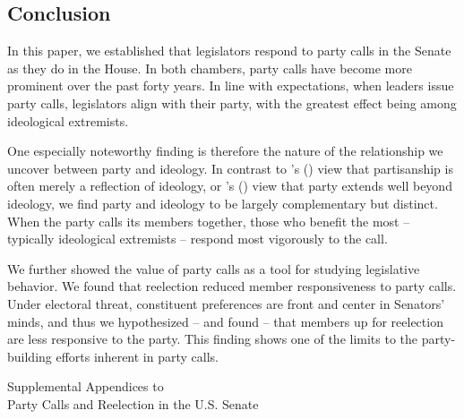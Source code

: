 \documentclass[12pt]{article}
\def\citeapos#1{\citeauthor{#1}'s (\citeyear{#1})} %
\begin{document}
\subsection*{Conclusion}

In this paper, we established that legislators respond to party calls in the Senate as they do in the House. In both chambers, party calls have become more prominent over the past forty years.  In line with expectations, when leaders issue party calls, legislators align with their party, with the greatest effect being among ideological extremists.

One especially noteworthy finding is therefore the nature of the relationship we uncover between party and ideology.  In contrast to \citeapos{Krehbiel:1993} view that partisanship is often merely a reflection of ideology, or \citeapos{Lee:2009} view that party extends well beyond ideology, we find party and ideology to be largely complementary but distinct.  When the party calls its members together, those who benefit the most -- typically ideological extremists -- respond most vigorously to the call.

We further showed the value of party calls as a tool for studying legislative behavior.  We found that reelection reduced member responsiveness to party calls.  Under electoral threat, constituent preferences are front and center in Senators' minds, and thus we hypothesized -- and found -- that members up for reelection are less responsive to the party. This finding shows one of the limits to the party-building efforts inherent in party calls.

\clearpage



\clearpage

\setcounter{table}{0}
\setcounter{footnote}{0}
\setcounter{figure}{0}
\setcounter{page}{0}


\begin{center}
\vspace*{1in}
{\Large Supplemental Appendices to\\}
{\LARGE Party Calls and Reelection in the U.S. Senate}
\end{center}
\vspace*{1in}

\thispagestyle{empty}

\setcounter{tocdepth}{1}
\setcounter{secnumdepth}{0}
\tableofcontents
\end{document}
